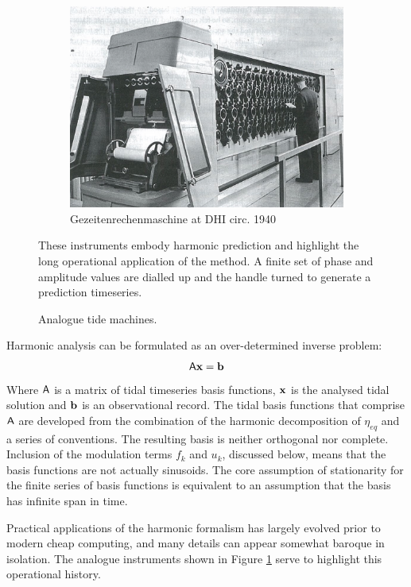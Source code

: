 \begin{figure}[!hbt]
\begin{subfigure}[t]{\figwidthHalf}
    	\includegraphics[width=\textwidth]{figures/images/DHI_machine_cartwright_fig11p2.png}
	    \caption{Gezeitenrechenmaschine at DHI circ. 1940 }
	\end{subfigure}
	\caption{Analogue tide machines.}{These instruments embody harmonic prediction and highlight the long operational application of the method.  A finite set of phase and amplitude values are dialled up and the handle turned to generate a prediction timeseries.}
	\label{fig:tide_machines}
\end{figure}
Harmonic analysis can be formulated as an over-determined inverse problem:
\begin{equation}
    \label{E:Axb}   
    \mathsf{A} \mathbf{x}=\mathbf{b} 
\end{equation}
Where $\mathsf{A}$ is a matrix of tidal timeseries basis functions, $\mathbf{x}$ is the analysed tidal solution and $\mathbf{b}$ is an observational record. The tidal basis functions that comprise $\mathsf{A}$ are developed from the combination of the harmonic decomposition of $\eta_{eq}$ and a series of conventions.  
The resulting basis is neither orthogonal nor complete. Inclusion of the modulation terms $f_k$ and $u_k$, discussed below, means that the basis functions are not actually sinusoids. The core assumption of stationarity for the finite series of basis functions is equivalent to an assumption that the basis has infinite span in time.   

Practical applications of the harmonic formalism has largely evolved prior to modern cheap computing, and many details can appear somewhat baroque in isolation.  The analogue instruments shown in Figure \ref{fig:tide_machines} serve to highlight this operational history.


